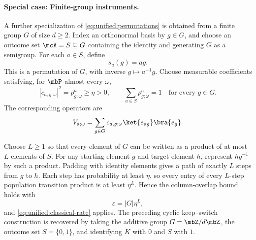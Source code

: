 \documentclass[a4paper]{article}
\numberwithin{equation}{section}   %
\theoremstyle{plain}   %
\theoremstyle{plain}   %
\theoremstyle{examplestyle}
\DeclareMathOperator{\pr}{\mbP}           %
\begin{document}
        \paragraph{Special case: Finite-group instruments.}
        \label{par:finite-group-instruments}
            A further specialization of \eqref{eq:unified:permutations} is obtained from a finite group $G$ of size $d\ge2$.
            Index an orthonormal basis by $g\in G$, and choose an outcome set $\mcA=S\subseteq G$ containing the identity and generating $G$ as a semigroup.
            For each $a\in S$, define
            \[
                s_a(g)=ag.
            \]
            This is a permutation of $G$, with inverse $g\mapsto a^{-1}g$.
            Choose measurable coefficients satisfying, for $\pr$-almost
            every $\omega$,
            \[
                 |c_{a,g;\omega}|^2=p_{g;\omega}^a\ge\eta>0,
                 \qquad
                 \sum_{a\in S}p_{g;\omega}^a=1
                 \quad\text{for every }g\in G.
            \]
            The corresponding operators are
            \[
             V_{a;\omega}
             =\sum_{g\in G}c_{a,g;\omega}
                   \ket{e_{ag}}\bra{e_g}.
            \]
            
            Choose $L\ge1$ so that every element of $G$ can be written as a product of at most $L$ elements of $S$.
            For any starting element $g$ and target element $h$, represent $hg^{-1}$ by such a product.
            Padding with identity elements gives a path of exactly $L$ steps from $g$ to $h$.
            Each step has probability at least $\eta$, so every entry of every $L$-step population transition product is at least  $\eta^L$.
            Hence the column-overlap bound holds with
            \[
                \varepsilon=|G|\eta^L,
            \]
            and \eqref{eq:unified:classical-rate} applies.
            The preceding cyclic keep--switch construction is recovered by taking the additive group $G=\mbZ/d\mbZ$, the outcome set $S=\{0,1\}$, and identifying $K$ with $0$ and $S$ with $1$.
            
\end{document}
